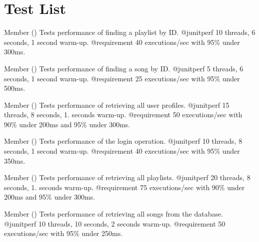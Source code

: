 \chapter{Test List}
\hypertarget{test}{}\label{test}

\begin{DoxyRefList}
\item[Member \doxylink{classcom_1_1deusto_1_1deuspotify_1_1_deuspotify_perf_i_t_aa1e705595754e5fb00b01137a4b72ba3}{com.deusto.deuspotify.Deuspotify\+Perf\+IT.test\+Find\+Playlist\+By\+Id\+Performance} ()]\label{test__test000078}%
%
Tests performance of finding a playlist by ID. @junitperf 10 threads, 6 seconds, 1 second warm-\/up. @requirement 40 executions/sec with 95\% under 300ms.  
\item[Member \doxylink{classcom_1_1deusto_1_1deuspotify_1_1_deuspotify_perf_i_t_a97a302051702747b2ef5c312692ae656}{com.deusto.deuspotify.Deuspotify\+Perf\+IT.test\+Find\+Song\+By\+Id\+Performance} ()]\label{test__test000077}%
%
Tests performance of finding a song by ID. @junitperf 5 threads, 6 seconds, 1 second warm-\/up. @requirement 25 executions/sec with 95\% under 500ms.  
\item[Member \doxylink{classcom_1_1deusto_1_1deuspotify_1_1_deuspotify_perf_i_t_a2650c6e6e1a4a9b8bc40f05d0bdbd189}{com.deusto.deuspotify.Deuspotify\+Perf\+IT.test\+Get\+All\+Profiles\+Performance} ()]\label{test__test000079}%
%
Tests performance of retrieving all user profiles. @junitperf 15 threads, 8 seconds, 1. seconds warm-\/up. @requirement 50 executions/sec with 90\% under 200ms and 95\% under 300ms.  
\item[Member \doxylink{classcom_1_1deusto_1_1deuspotify_1_1_deuspotify_perf_i_t_ae86d90ff0a2fc25d7c29e859200c4a66}{com.deusto.deuspotify.Deuspotify\+Perf\+IT.test\+Login\+Performance} ()]\label{test__test000080}%
%
Tests performance of the login operation. @junitperf 10 threads, 8 seconds, 1 second warm-\/up. @requirement 40 executions/sec with 95\% under 350ms.  
\item[Member \doxylink{classcom_1_1deusto_1_1deuspotify_1_1_deuspotify_perf_i_t_a1224ab3e104c5f88028530ac600fb920}{com.deusto.deuspotify.Deuspotify\+Perf\+IT.test\+Retrieve\+All\+Playlists\+Performance} ()]\label{test__test000076}%
%
Tests performance of retrieving all playlists. @junitperf 20 threads, 8 seconds, 1. seconds warm-\/up. @requirement 75 executions/sec with 90\% under 200ms and 95\% under 300ms.  
\item[Member \doxylink{classcom_1_1deusto_1_1deuspotify_1_1_deuspotify_perf_i_t_aeb6d9d92daf7457d86ee5d20a166aa72}{com.deusto.deuspotify.Deuspotify\+Perf\+IT.test\+Retrieve\+All\+Songs\+Performance} ()]\label{test__test000075}%
%
Tests performance of retrieving all songs from the database. @junitperf 10 threads, 10 seconds, 2 seconds warm-\/up. @requirement 50 executions/sec with 95\% under 250ms. 
\end{DoxyRefList}